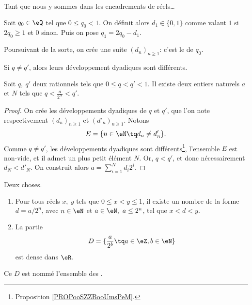 Tant que nous y sommes dans les encadrements de réels\dots
\begin{normaltext}
	Soit \(q_0 \in \eQ \) tel que \( 0 \leq q_0 < 1 \). On définit alors \( d_1 \in \{0, 1\} \) comme valant \( 1 \) si \( 2 q_0 \geq 1 \) et \(0 \) sinon. Puis on pose \( q_1 = 2 q_0 - d_1 \).

	Poursuivant de la sorte, on crée une suite \( (d_n)_{n\geq 1} \): c'est le  de \( q_0 \).
\end{normaltext}

\begin{proposition}	\label{PROPooSZZBooUmsPeM}
	Si \( q\neq q'\), alors leurs développement dyadiques sont différents.
\end{proposition}


\begin{lemma}        \label{LEMooRSLIooVrZMxM}
	Soit \( q,\ q' \) deux rationnels tels que \( 0 \leq q < q' < 1 \). Il existe deux entiers naturels \( a \) et \( N \) tels que \( q < \frac a {2^N} < q' \).
\end{lemma}
\begin{proof}
	On crée les développements dyadiques de \( q \) et \( q' \), que l'on note respectivement \( (d_n)_{n\geq 1} \) et \( (d'_n)_{n\geq 1} \). Notons
	\begin{equation}
		E = \{ n \in \eN \tq d_n \neq d'_n \}.
	\end{equation}
	Comme \( q \neq q' \), les développements dyadiques sont différents\footnote{Proposition \ref{PROPooSZZBooUmsPeM}.}, l'ensemble \(E\) est non-vide, et il admet un plus petit élément \(N \). Or, \( q < q' \), et donc nécessairement \( d_N < d'_N \). On construit alors \( a = \sum_{i=1}^{N} d_i 2^i \).
\end{proof}

\begin{corollary}    \label{CorDensiteDyadiques}
	Deux choses.
	\begin{enumerate}
		\item
		      Pour tous réels \(x,\ y\) tels que \( 0 \leq x < y \leq 1 \), il existe un nombre de la forme \( d = a / 2^n \), avec \( n \in \eN \) et \( a \in \eN,\ a \leq 2^n\), tel que \( x < d < y \).
		\item
		      La partie
		      \begin{equation}
			      D=\{ \frac{ a }{ 2^b }\tq a\in \eZ,b\in \eN \}
		      \end{equation}
		      est dense dans \( \eR\).
	\end{enumerate}
	Ce \( D\) est nommé l'ensemble des .
\end{corollary}


